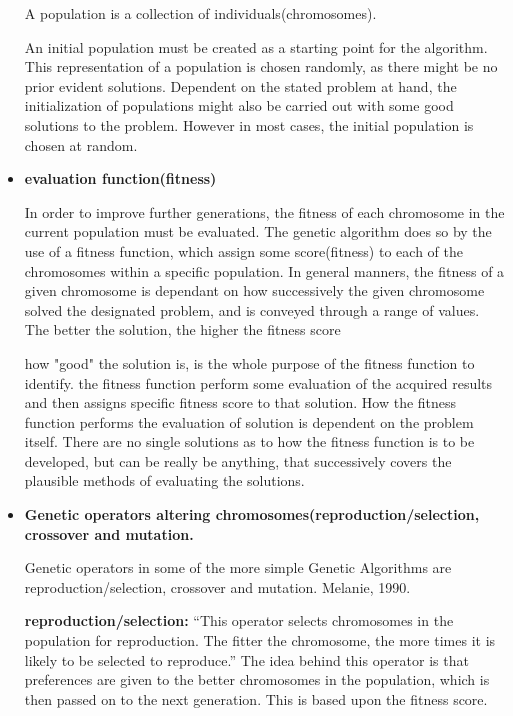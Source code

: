 \begin{itemize}
A population is a collection of individuals(chromosomes).  



An initial population must be created as a starting point for the algorithm. This representation of a population is chosen randomly, as there might be no prior evident solutions. Dependent on the stated problem at hand, the initialization of populations might also be carried out with some good solutions to the problem. However in most cases, the initial population is chosen at random. \cite[pp. 41/42]{Sivanandam2008}





\item \textbf{evaluation function(fitness)}

In order to improve further generations, the fitness of each chromosome in the current population must be evaluated. The genetic algorithm does so by the use of a fitness function, which assign some score(fitness) to each of the chromosomes within a specific population.
In general manners, the fitness of a given chromosome is dependant on how successively the given chromosome solved the designated problem, and is conveyed through a range of values. The better the solution, the higher the fitness score \cite[pp. 8]{Melanie1990}

how "good" the solution is, is the whole purpose of the fitness function to identify. the fitness function perform some evaluation of the acquired results and then assigns specific fitness score to that solution. How the fitness function performs the evaluation of solution is dependent on the problem itself. There are no single solutions as to how the fitness function is to be developed, but can be really be anything, that successively covers the plausible methods of evaluating the solutions. \cite[pp. 31]{Sivanandam2008}




\item \textbf{Genetic operators altering chromosomes(reproduction/selection, crossover and mutation.}


Genetic operators in some of the more simple Genetic Algorithms are reproduction/selection, crossover and mutation. Melanie, 1990. \cite{Melanie1990}

\textbf{reproduction/selection:} \enquote{This operator selects chromosomes in the population for reproduction. The fitter the chromosome, the more times it is likely to be selected to reproduce.} \cite[pp. 8]{Melanie1990}
The idea behind this operator is that preferences are given to the better chromosomes in the population, which is then passed on to the next generation. This is based upon the fitness score.


\end{itemize}

